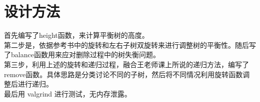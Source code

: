 \documentclass[UTF8]{ctexart}
\begin{document}
\pagestyle{fancy}
\fancyhead{}

\section{设计方法}

首先编写了height函数，来计算平衡树的高度。\\
  第二步是，依据参考书中的旋转和左右子树双旋转来进行调整树的平衡性。随后写了balance函数用来应对删除过程中的树失衡问题。\\
  第三步，利用上述的旋转和递归过程，融合王老师课上所说的递归方法，编写了remove函数。具体思路是分类讨论不同的子树，然后将不同情况利用旋转函数调整后进行递归。
\\


最后用 valgrind 进行测试，无内存泄露。
\end{document}
